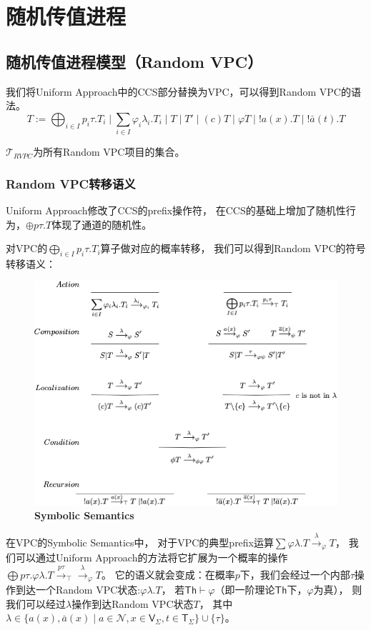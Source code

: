 
\chapter{随机传值进程}

\section{随机传值进程模型（Random VPC）}
我们将Uniform Approach中的CCS部分替换为VPC，可以得到Random VPC的语法。
$$T:=\bigoplus_{i\in I}p_i \tau.T_i\mid \sum_{i\in I} \varphi_i\lambda_i.T_i\mid T \mid T'\mid (c)T\mid \varphi T\mid !a(x).T \mid !\bar{a}(t).T$$

$\mathcal{T}_{RVPC}$为所有Random VPC项目的集合。

\subsection{Random VPC转移语义}
Uniform Approach修改了CCS的prefix操作符，
在CCS的基础上增加了随机性行为，$\oplus p\tau.T$体现了通道的随机性。

对VPC的$\bigoplus_{i\in I}p_i \tau.T_i$算子做对应的概率转移，
我们可以得到Random VPC的符号转移语义：

\begin{figure}[!htbp]
	\small
	\centering
	\includegraphics[width=13cm]{../figure/symbolic_sematic.png}
    \caption{\textbf{Symbolic Semantics}}
    \label{fig_sematic}
\end{figure}

在VPC的Symbolic Semantics中，
对于VPC的典型prefix运算$\sum \varphi \lambda. T\stackrel{\lambda}{\rightarrow}_{\varphi} T$，
我们可以通过Uniform Approach的方法将它扩展为一个概率的操作
$\bigoplus p\tau.\varphi \lambda. T\stackrel{p\tau}{\rightarrow}_{\top}\stackrel{\lambda}{\rightarrow}_{\varphi} T$。
它的语义就会变成：在概率$p$下，我们会经过一个内部$\tau$操作到达一个Random VPC状态:$\varphi\lambda.T$，
若$\mathsf{Th}\vdash \varphi$（即一阶理论$\mathsf{Th}$下，$\varphi$为真），
则我们可以经过$\lambda$操作到达Random VPC状态$T$， 其中$\lambda \in \{a(x),\bar{a}(x)\mid a\in \mathcal{N}, x\in \mathsf{V}_\Sigma, t\in \mathsf{T}_\Sigma\}\cup \{\tau\}$。

